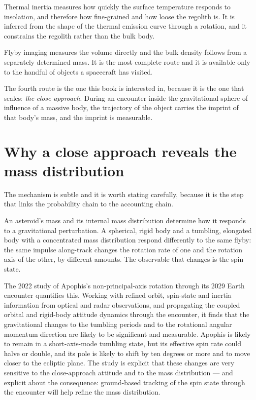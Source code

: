 Thermal inertia measures how quickly the surface temperature responds to
insolation, and therefore how fine-grained and how loose the regolith is.
It is inferred from the shape of the thermal emission curve through a
rotation, and it constrains the regolith rather than the bulk body.

Flyby imaging measures the volume directly and the bulk density follows from
a separately determined mass. It is the most complete route and it is
available only to the handful of objects a spacecraft has visited.

The fourth route is the one this book is interested in, because it is the one
that scales: \emph{the close approach}. During an encounter inside the
gravitational sphere of influence of a massive body, the trajectory of the
object carries the imprint of that body's mass, and the imprint is
measurable.

\section{Why a close approach reveals the mass distribution}

The mechanism is subtle and it is worth stating carefully, because it is the
step that links the probability chain to the accounting chain.

An asteroid's mass and its internal mass distribution determine how it
responds to a gravitational perturbation. A spherical, rigid body and a
tumbling, elongated body with a concentrated mass distribution respond
differently to the same flyby: the same impulse along-track changes the
rotation rate of one and the rotation axis of the other, by different
amounts. The observable that changes is the spin state.

The 2022 study of Apophis's non-principal-axis rotation through its 2029
Earth encounter quantifies this. Working with refined orbit, spin-state and
inertia information from optical and radar observations, and propagating the
coupled orbital and rigid-body attitude dynamics through the encounter, it
finds that the gravitational changes to the tumbling periods and to the
rotational angular momentum direction are likely to be significant and
measurable. Apophis is likely to remain in a short-axis-mode tumbling state,
but its effective spin rate could halve or double, and its pole is likely to
shift by ten degrees or more and to move closer to the ecliptic plane. The
study is explicit that these changes are very sensitive to the close-approach
attitude and to the mass distribution --- and explicit about the
consequence: ground-based tracking of the spin state through the encounter
will help refine the mass distribution.

